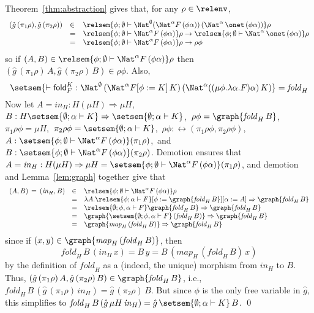\documentclass{lmcs}
\theoremstyle{plain}\newtheorem{satz}[thm]{Satz}
\newcommand{\fold}{\mathsf{fold}}
\begin{document}
\proof
Theorem~\ref{thm:abstraction} gives that, for any 
$\rho \in \relenv$,
\[\begin{array}{lll}
(\hat{g} \,(\pi_1 \rho), \hat{g}\, (\pi_2 \rho)) & \in &
\relsem{\phi;\emptyset\vdash \Nat^{\emptyset} (\Nat^\alpha 
  F\, (\phi\alpha))\, (\Nat^\alpha\,\onet \, (\phi\alpha))}
\rho\\ 
& = & \relsem{\phi;\emptyset\vdash \Nat^\alpha F\,
  (\phi\alpha)}\rho \to \relsem{\phi;\emptyset\vdash
  \Nat^\alpha\,\onet \, (\phi\alpha)}\rho\\ 
& = & \relsem{\phi;\emptyset\vdash \Nat^\alpha F\,
  (\phi\alpha)}\rho \to \rho \phi
\end{array}\]
\noindent
so if $(A, B) \in \relsem{\phi;\emptyset\vdash \Nat^\alpha F\,
  (\phi\alpha)}\rho$ then $(\hat{g} \,(\pi_1 \rho)\, A, \hat{g}\, (\pi_2 \rho)\,
B) \in \rho \phi$.
Also,
\[\setsem{\vdash \fold_F^K :
  \Nat^{\emptyset}\, (\Nat^\alpha F[\phi := K]\,K)\, (\Nat^\alpha
  ((\mu \phi.\lambda\alpha.F)\alpha)\,K)} = \mathit{fold}_H\]
Now let $A = \mathit{in}_H : H (\mu H) \Rightarrow
\mu H$,\, $B : H\setsem{\emptyset;\alpha\vdash K} \Rightarrow
\setsem{\emptyset;\alpha \vdash K}$,\, $\rho \phi =
\graph{\mathit{fold}_H\, B}$,\, $\pi_1 \rho \phi = \mu H$,\, $\pi_2
\rho \phi = \setsem{\emptyset;\alpha\vdash K}$,\, $\rho \phi :
\rel(\pi_1 \rho \phi, \pi_2 \rho \phi)$,\, $A : \setsem{\phi;
  \emptyset \vdash \Nat^\alpha F \, (\phi \alpha)} (\pi_1 \rho)$,\,
and $B : \setsem{\phi; \emptyset \vdash \Nat^\alpha F \, (\phi
  \alpha)} (\pi_2 \rho)$.
Demotion ensures that $A = \mathit{in}_H : H(\mu H) \Rightarrow \mu H
= \setsem{\phi;\emptyset \vdash \Nat^\alpha F
  \,(\phi\alpha)}(\pi_1\rho)$,
and demotion and Lemma~\ref{lem:graph} together give that
\[\begin{array}{lll}
(A,B) \,=\, (\mathit{in}_H,B) & \in & \relsem{\phi;\emptyset\vdash
  \Nat^\alpha F\, (\phi\alpha)}\rho\\
& = & \lambda A. \relsem{\phi;\alpha\vdash F}[\phi :=
  \graph{\mathit{fold}_H\, B}][\alpha := A] \Rightarrow 
 \graph{\mathit{fold}_H\, B} \\ 
& = & \relsem{\emptyset;\phi,\alpha\vdash F}
  \graph{\mathit{fold}_H\, B} \Rightarrow \graph{\mathit{fold}_H\,
    B}\\
  & = & \graph{\setsem{\emptyset;\phi,\alpha\vdash F}
    \,(\mathit{fold}_H\,B)} \Rightarrow \graph{\mathit{fold}_H\, B}\\
  & = & \graph{\mathit{map}_H \,(\mathit{fold}_H\,B)} \Rightarrow
\graph{\mathit{fold}_H\, B}\\
\end{array}\]
since if $(x,y) \in \graph{\mathit{map}_H \,(\mathit{fold}_H\,B)}$,
then $$\mathit{fold}_H\, B\, (\mathit{in}_H\,x) = B\,y = B\,
(\mathit{map}_H \,(\mathit{fold}_H\,B) \, x)$$ by the definition of
$\mathit{fold}_H$ as a (indeed, the unique) morphism from
$\mathit{in}_H$ to $B$.  Thus, $(\hat{g} \,(\pi_1 \rho)\, A,  \hat{g}\, (\pi_2
\rho)\, B) \in \graph{\mathit{fold}_H\, B}$, i.e., $\mathit{fold}_H \,
B \, (\hat{g}\, (\pi_1 \rho) \, \mathit{in}_H) = \hat{g}\,(\pi_2 \rho)\,B$.  But
since $\phi$ is the only free variable in $\hat{g}$, this simplifies to
$\mathit{fold}_H\, B \, (\hat{g}\, \mu H\, \mathit{in}_H) =
\hat{g}\,\setsem{\emptyset;\alpha\vdash K}\,B$. \qed
\end{document}
